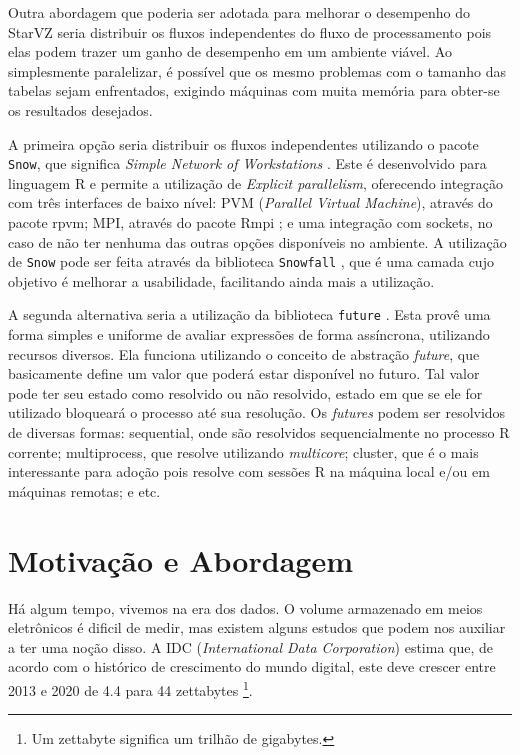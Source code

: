 Outra abordagem que poderia ser adotada para melhorar o desempenho do StarVZ 
seria distribuir os fluxos independentes do fluxo de processamento pois elas 
podem trazer um ganho de desempenho em um ambiente viável. Ao simplesmente 
paralelizar, é possível que os mesmo problemas com o tamanho das tabelas sejam 
enfrentados, exigindo máquinas com muita memória para obter-se os resultados 
desejados. 

A primeira opção seria distribuir os fluxos independentes utilizando o pacote 
\texttt{Snow}, que significa \emph{Simple Network of Workstations} 
\cite{ref:snow}. Este é desenvolvido para linguagem R e permite a utilização
de \emph{Explicit parallelism}, oferecendo integração com três interfaces de 
baixo nível: PVM (\emph{Parallel Virtual Machine}), através do pacote rpvm; 
MPI, através do pacote Rmpi \cite{ref:rmpi}; e uma integração com sockets, no 
caso de não ter nenhuma das outras opções disponíveis no ambiente. A utilização 
de \texttt{Snow} pode ser feita através da biblioteca \texttt{Snowfall} 
\cite{ref:snowfall}, que é uma camada cujo objetivo é melhorar a usabilidade, 
facilitando ainda mais a utilização.

A segunda alternativa seria a utilização da biblioteca \texttt{future} 
\cite{ref:future}. Esta provê uma forma simples e uniforme de avaliar expressões 
de forma assíncrona, utilizando recursos diversos. Ela funciona utilizando o 
conceito de abstração \emph{future}, que basicamente define um valor que poderá 
estar disponível no futuro. Tal valor pode ter seu estado como resolvido ou não 
resolvido, estado em que se ele for utilizado bloqueará o processo até sua 
resolução. Os \emph{futures} podem ser resolvidos de diversas formas: 
sequential, onde são resolvidos sequencialmente no processo R corrente; 
multiprocess, que resolve utilizando \emph{multicore}; cluster, que é o mais 
interessante para adoção pois resolve com sessões R na máquina local e/ou em 
máquinas remotas; e etc.

\section{Motivação e Abordagem}\label{sect:motivation}

Há algum tempo, vivemos na era dos dados. O volume armazenado em meios 
eletrônicos é dificil de medir, mas existem alguns estudos que podem nos 
auxiliar a ter uma noção disso. A IDC (\textit{International Data Corporation}) 
\cite{ref:idcdigitaluniverse} estima que, de acordo com o histórico de 
crescimento do mundo digital, este deve crescer entre 2013 e 2020 de 4.4 para 44 
zettabytes \footnote{Um zettabyte significa um trilhão de gigabytes.}.

